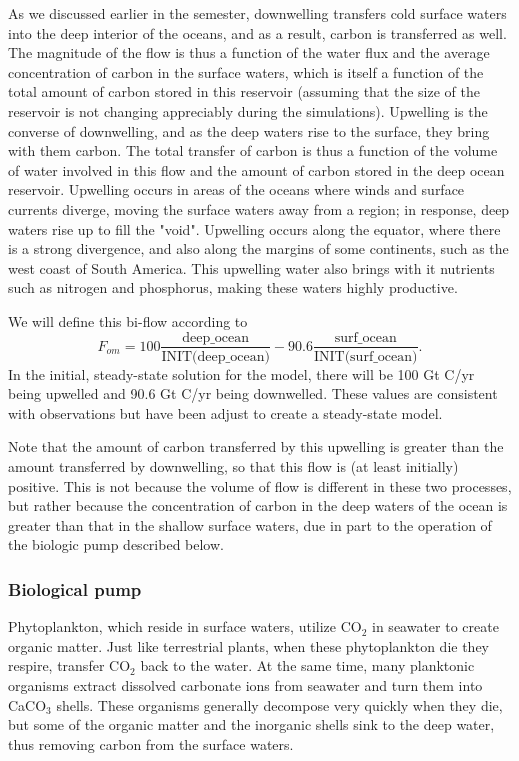\documentclass[11pt,letterpaper]{article}
\begin{document}
As we discussed earlier in the semester, downwelling transfers cold surface waters into the deep interior of the oceans, and as a result, carbon is transferred as well. The magnitude of the flow is thus a function of the water flux and the average concentration of carbon in the surface waters, which is itself a function of the total amount of carbon stored in this reservoir (assuming that the size of the reservoir is not changing appreciably during the simulations). Upwelling is the converse of downwelling, and as the deep waters rise to the surface, they bring with them carbon. The total transfer of carbon is thus a function of the volume of water involved in this flow and the amount of carbon stored in the deep ocean reservoir. Upwelling occurs in areas of the oceans where winds and surface currents diverge, moving the surface waters away from a region; in response, deep waters rise up to fill the "void". Upwelling occurs along the equator, where there is a strong divergence, and also along the margins of some continents, such as the west coast of South America. This upwelling water also brings with it nutrients such as nitrogen and phosphorus, making these waters highly productive.

We will define this bi-flow according to
\begin{equation}
F_{om} = 100\frac{\mbox{deep\_ocean}}{\mbox{INIT(deep\_ocean)}}-90.6\frac{\mbox{surf\_ocean}}{\mbox{INIT(surf\_ocean)}}.
\end{equation}
In the initial, steady-state solution for the model, there will be 100 Gt C/yr being upwelled and 90.6 Gt C/yr being downwelled. These values are consistent with observations but have been adjust to create a steady-state model.

Note that the amount of carbon transferred by this upwelling is greater than the amount transferred by downwelling, so that this flow is (at least initially) positive. This is not because the volume of flow is different in these two processes, but rather because the concentration of carbon in the deep waters of the ocean is greater than that in the shallow surface waters, due in part to the operation of the biologic pump described below.

\subsubsection*{Biological pump}
Phytoplankton, which reside in surface waters, utilize CO$_2$ in seawater to create organic matter. Just like terrestrial plants, when these phytoplankton die they respire, transfer CO$_2$ back to the water. At the same time, many planktonic organisms extract dissolved carbonate ions from seawater and turn them into CaCO$_3$ shells. These organisms generally decompose very quickly when they die, but some of the organic matter and the inorganic shells sink to the deep water, thus removing carbon from the surface waters.  
\end{document}
